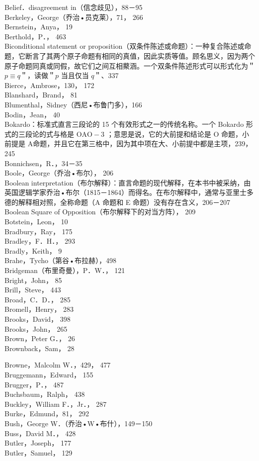 Belief．disagreement in（信念歧见），88－95\\
Berkeley，George（乔治•员克莱），71， 266\\
Bernstein，Anya， 19\\
Berthold，P．， 463\\
Biconditional statement or proposition（双条件陈述或命题）：一种复合陈述或命题，它断言了其两个原子命题有相同的真值，因此实质等值。顾名思义，因为两个原子命题同真或同假，故它们之间互相藂涵。一个双条件陈述形式可以形式化为＂$p \equiv q$＂，读做＂$p$ 当且仅当 $q$＂、337\\
Bierce，Ambrose，130， 172\\
Blanshard，Brand， 81\\
Blumenthal，Sidney（西尼•布鲁门多），166\\
Bodin，Jean， 40\\
Bokardo：标准式直言三段论的 15 个有效形式之一的传统名称。一个 Bokardo 形式的三段论的式与格是 $\mathrm{OAO}-3$ ；意思是说，它的大前提和结论是 O 命题，小前提是 A命题，并且它在第三格中，因为其中项在大、小前提中都是主项，239， 245\\
Bonnichsen，R．，34－35\\
Boole，George（乔治•布尔）， 206\\
Boolean interpretation（布尔解释）：直言命题的现代解释，在本书中被采纳，由英国逻辑学家乔治•布尔（1815－1864）而得名。在布尔解释中，通常与亚里士多德的解释相对照，全称命题（A 命题和 E 命题）没有存在含义，206－207\\
Boolean Square of Opposition（布尔解释下的对当方阵）， 209\\
Botstein，Leon， 10\\
Bradbury，Ray， 175\\
Bradley，F．H．， 293\\
Bradly，Keith， 9\\
Brahe，Tycho（第谷•布拉赫），498\\
Bridgeman（布里奇曼），P．W．， 121\\
Bright，John， 85\\
Brill，Steve， 443\\
Broad，C．D．， 285\\
Bromell，Henry， 283\\
Brooks，David， 398\\
Brooks，John， 265\\
Brown，Peter G．， 26\\
Brownback，Sam， 28

Browne，Malcolm W．，429， 477\\
Bruggemann，Edward， 155\\
Brugger，P．， 487\\
Buchsbaum，Ralph， 438\\
Buckley，William F．，Jr．， 287\\
Burke，Edmund，81， 292\\
Bush，George W．（乔治•W•布什），149－150\\
Buss，David M．， 428\\
Butler，Joseph， 177\\
Butler，Samuel， 129

